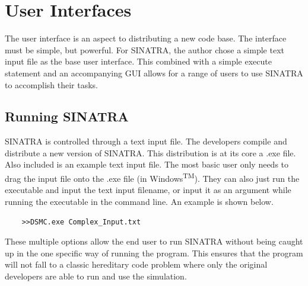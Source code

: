 \section{User Interfaces}
The user interface is an aspect to distributing a new code base. The interface must be simple, but powerful. For SINATRA, the author chose a simple text input file as the base user interface. This combined with a simple execute statement and an accompanying GUI allows for a range of users to use SINATRA to accomplish their tasks.

\subsection{Running SINATRA}
SINATRA is controlled through a text input file. The developers compile and distribute a new version of SINATRA. This distribution is at its core a .exe file. Also included is an example text input file. The most basic user only needs to drag the input file onto the .exe file (in Windows\textsuperscript{TM}). They can also just run the executable and input the text input filename, or input it as an argument while running the executable in the command line. An example is shown below. \par

\begin{verbatim}
    >>DSMC.exe Complex_Input.txt
\end{verbatim}

\indent These multiple options allow the end user to run SINATRA without being caught up in the one specific way of running the program. This ensures that the program will not fall to a classic hereditary code problem where only the original developers are able to run and use the simulation.

